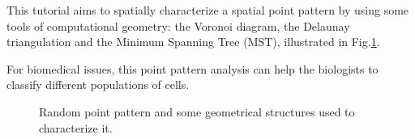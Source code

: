 \def\difficulty{2}

\begin{note}
This tutorial aims to spatially characterize a spatial point pattern by using some 
tools of computational geometry: the Voronoi diagram, 
the Delaunay triangulation and the Minimum Spanning Tree (MST), illustrated in Fig.\ref{fig:point_processes_voronoi:enonce:geometry}.

For biomedical issues, this point pattern analysis can help the biologists 
to classify different populations of cells.
\end{note}

\begin{figure}[htbp]
 \centering\caption{Random point pattern and some geometrical structures used to characterize it.}%
 \hfill
 
 \hfill
 \label{fig:point_processes_voronoi:enonce:geometry}%
\end{figure}


